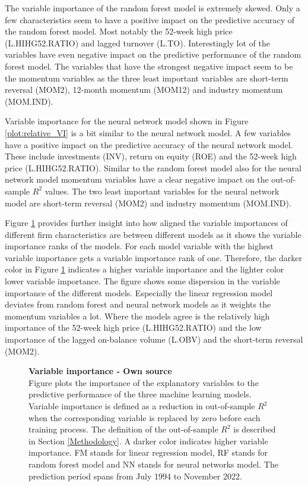 \documentclass[12pt]{article}
\begin{document}
The variable importance of the random forest model is extremely skewed. Only a few characteristics seem to have a positive impact on the predictive accuracy of the random forest model. Most notably the 52-week high price (L.HIHG52.RATIO) and lagged turnover (L.TO). Interestingly lot of the variables have even negative impact on the predictive performance of the random forest model. The variables that have the strongest negative impact seem to be the momentum variables as the three least important variables are short-term reversal (MOM2), 12-month momentum (MOM12) and industry momentum (MOM.IND). \par

Variable importance for the neural network model shown in Figure \ref{plot:relative_VI} is a bit similar to the neural network model. A few variables have a positive impact on the predictive accuracy of the neural network model. These include investments (INV), return on equity (ROE) and the 52-week high price (L.HIHG52.RATIO). Similar to the random forest model also for the neural network model momentum variables have a clear negative impact on the out-of-sample $R^2$ values. The two least important variables for the neural network model are short-term reversal (MOM2) and industry momentum (MOM.IND). \par

Figure \ref{plot:combined_VI} provides further insight into how aligned the variable importances of different firm characteristics are between different models as it shows the variable importance ranks of the models. For each model variable with the highest variable importance gets a variable importance rank of one. Therefore, the darker color in Figure \ref{plot:combined_VI} indicates a higher variable importance and the lighter color lower variable importance. The figure shows some dispersion in the variable importance of the different models. Especially the linear regression model deviates from random forest and neural network models as it weights the momentum variables a lot. Where the models agree is the relatively high importance of the 52-week high price (L.HIHG52.RATIO) and the low importance of the lagged on-balance volume (L.OBV) and the short-term reversal (MOM2). \par

\begin{figure}[ht]
\centering
\caption[Variable importance]{\textbf{Variable importance \textnormal{- Own source}}\\ Figure plots the importance of the explanatory variables to the predictive performance of the three machine learning models. Variable importance is defined as a reduction in out-of-sample $R^2$ when the corresponding variable is replaced by zero before each training process. The definition of the out-of-sample $R^2$ is described in Section \ref{Methodology}. A darker color indicates higher variable importance. FM stands for linear regression model, RF stands for random forest model and NN stands for neural networks model. The prediction period spans from July 1994 to November 2022.}

\label{plot:combined_VI}
\end{figure}
\end{document}
